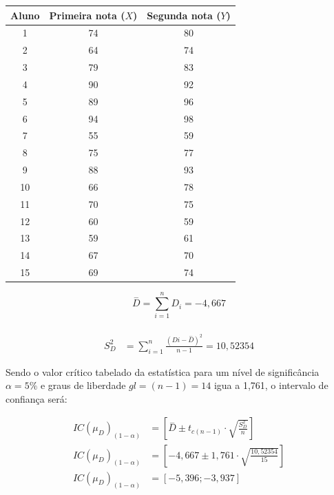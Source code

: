 \documentclass[
]{book}
\begin{document}
\hfill\break

\begin{table}[h]
\centering
\begin{tabular}{|c|c|c|}
\hline 
Aluno & Primeira nota ($X$)& Segunda nota ($Y$) \\
\hline 
1 & 74 & 80 \\ 
\hline 
2 & 64 & 74 \\ 
\hline 
3 & 79 & 83 \\ 
\hline 
4 & 90 & 92 \\ 
\hline 
5 & 89 & 96 \\ 
\hline 
6 & 94 & 98 \\ 
\hline 
7 & 55 & 59 \\ 
\hline 
8 & 75 & 77 \\ 
\hline 
9 & 88 & 93 \\ 
\hline 
10 & 66 & 78 \\ 
\hline 
11 & 70 & 75 \\ 
\hline 
12 & 60 & 59 \\ 
\hline 
13 & 59 & 61 \\ 
\hline 
14 & 67 & 70 \\ 
\hline 
15 & 69 & 74 \\ 
\hline 
\end{tabular} 
\end{table}

\hfill\break

\[
\stackrel{-}{D}=\sum_{i=1}^{n}D_{i}=-4,667
\]\\

\begin{align*}
S^{2}_{D} & =\sum_{i=1}^{n}\frac{(D{i}-\stackrel{-}{D})^{2}}{n-1}=10,52354
\end{align*}

\hfill\break

Sendo o valor crítico tabelado da estatística para um nível de significância \(\alpha=5\%\) e graus de liberdade \(gl=(n-1)=14\) igua a 1,761, o intervalo de confiança será:

\hfill\break

\begin{align*}
IC(\mu_{D})_{(1-\alpha)} & = [\stackrel{-}{D} \pm {t}_{c (n-1)} \cdot   \sqrt{\frac{S_{D}^{2}}{n} }  ]\\
IC(\mu_{D})_{(1-\alpha)} & = [-4,667 \pm 1,761 \cdot   \sqrt{\frac{10,52354}{15} }  ]\\
IC(\mu_{D})_{(1-\alpha)} & = [-5,396; -3,937]
\end{align*}
\end{document}
